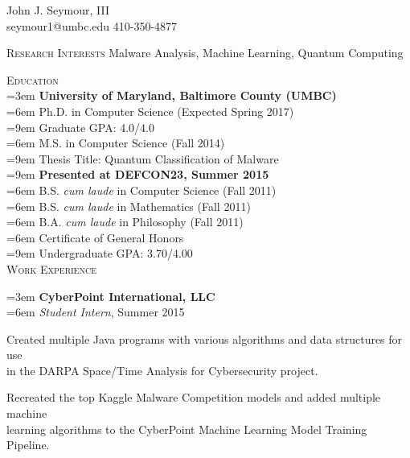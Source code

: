 \pagestyle{headings}
\newcommand{\tab}{\hspace*{3em}}
\newcommand{\atab}{\hangindent=3em \hangafter=0}
\newcommand{\btab}{\hangindent=6em \hangafter=0}
\newcommand{\ctab}{\hangindent=9em \hangafter=0}
\newcommand{\untab}{\hspace*{-3em}}

\newenvironment{my_list}
{\begin{itemize}
    \vspace{-4mm}
    \setlength{\itemsep}{0pt}
    \setlength{\itemindent}{6em}
    \setlength{\parskip}{0pt}
    \setlength{\parsep}{0pt}}
{\end{itemize}}

\oddsidemargin  -0.4in
\textwidth      7in
\topmargin  -0.5in
\headheight 0.0in
\headsep    0.0in
\textheight 11.0in


\centering
\LARGE \untab John J. Seymour, III\\
\normalsize
\medskip
\untab \untab seymour1@umbc.edu \tab \tab 410-350-4877\\
\medskip
\hline
\bigskip

\raggedright
\textsc{Research Interests} \tab Malware Analysis, Machine Learning, Quantum Computing\\
\medskip

\textsc{Education}\\
\atab \textbf{University of Maryland, Baltimore County (UMBC)}\\
\btab Ph.D. in Computer Science (Expected Spring 2017)\\
\ctab Graduate GPA: 4.0/4.0\\
\btab M.S. in Computer Science (Fall 2014)\\
\ctab Thesis Title: Quantum Classification of Malware\\
\ctab \textbf{Presented at DEFCON23, Summer 2015}\\
\btab B.S. \emph{cum laude} in Computer Science (Fall 2011)\\
\btab B.S. \emph{cum laude} in Mathematics (Fall 2011) \\
\btab B.A. \emph{cum laude} in Philosophy (Fall 2011)\\
\btab Certificate of General Honors\\
\ctab Undergraduate GPA: 3.70/4.00\\
\bigskip
\textsc{Work Experience}

\medskip
\atab \textbf{CyberPoint International, LLC}\\
\btab \textit{Student Intern}, Summer 2015\\
\begin{my_list}
\item Created multiple Java programs with various algorithms and data structures for use\\ \tab \tab in the DARPA Space/Time Analysis for Cybersecurity project.
\item Recreated the top Kaggle Malware Competition models and added multiple machine\\ \tab \tab learning algorithms to the CyberPoint Machine Learning Model Training Pipeline.
\end{my_list}

